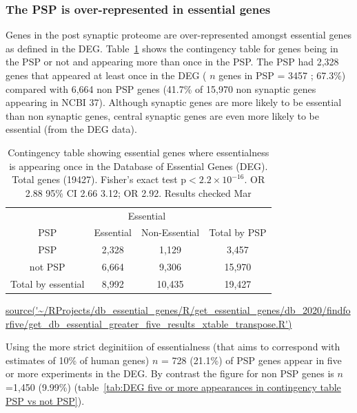 \clearpage

 
\subsubsection{The PSP is over-represented in essential genes}
\label{sec:results over representation PSP in DEG genes}
Genes in the post synaptic proteome are over-represented amongst essential genes as defined in the DEG. Table~\ref{tab:DEG any appearance contingency table PSP vs not PSP} shows the contingency table for genes being in the PSP or not and appearing more than once in the PSP. The PSP had 2,328 genes that appeared at least once in the DEG (    $n$ genes in PSP = 3457 ; 67.3\%) compared with 6,664 non PSP genes (41.7\% of 15,970 non synaptic genes appearing in NCBI 37). Although synaptic genes are more likely to be essential than non synaptic genes, central synaptic genes are even more likely to be essential (from the DEG data). 


\begin{table}
\centering
\begin{tabular}{cccc}
\toprule
& \multicolumn{2}{c}{Essential} & \\
\cmidrule{2-3}
    PSP & Essential &  Non-Essential & Total by PSP\vspace{1mm} \\
\midrule 
PSP      &   2,328     &     1,129 & 3,457\vspace{1mm}\\
not PSP    &  6,664      &    9,306  & 15,970\vspace{1mm}\\
\midrule
 Total by essential & 8,992 & 10,435 &  19,427\\ 

 
\bottomrule
\end{tabular}
\caption{Contingency table showing essential genes where essentialness is appearing once in the Database of Essential Genes (DEG). Total genes (19427).  Fisher's exact test p$<2.2\times10^{-16}$. OR 2.88 95\% CI 2.66 3.12; OR 2.92. Results checked Mar}
\tiny\url{source('~/RProjects/db_essential_genes/R/get_essential_genes/db_2020/findforfive/get_db_essential_greater_five_results_xtable_transpose.R')}  
\label{tab:DEG any appearance contingency table PSP vs not PSP}
\end{table}




Using the more strict deginitiion of essentialness (that aims to correspond with estimates of 10\% of human genes) $n$ = 728 (21.1\%) of PSP genes appear in five or more experiments in the DEG. By contrast the figure for non PSP genes is $n$=1,450 (9.99\%) (table~\ref{tab:DEG five or more appearances in contingency table PSP vs not PSP}). 

